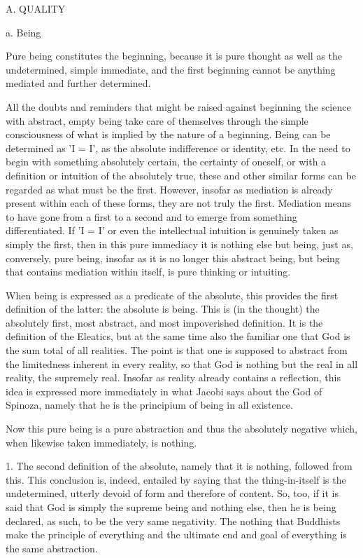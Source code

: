 A. QUALITY

a. Being

Pure being constitutes the beginning,
because it is pure thought as well as
the undetermined, simple immediate, and
the first beginning cannot be anything
mediated and further determined.

All the doubts and reminders that might be raised against
beginning the science with abstract, empty being
take care of themselves through the simple consciousness of
what is implied by the nature of a beginning.
Being can be determined as 'I = I',
as the absolute indifference or identity, etc.
In the need to begin with something absolutely certain,
the certainty of oneself, or with a definition or
intuition of the absolutely true,
these and other similar forms can be
regarded as what must be the first.
However, insofar as mediation is
already present within each of these forms,
they are not truly the first.
Mediation means to have gone from a first to a second
and to emerge from something differentiated.
If 'I = I' or even the intellectual intuition is
genuinely taken as simply the first,
then in this pure immediacy
it is nothing else but being, just as,
conversely, pure being, insofar as it is
no longer this abstract being,
but being that contains mediation within itself,
is pure thinking or intuiting.

When being is expressed as a predicate of the absolute,
this provides the first definition of the latter:
the absolute is being.
This is (in the thought) the absolutely first,
most abstract, and most impoverished definition.
It is the definition of the Eleatics,
but at the same time also the familiar one
that God is the sum total of all realities.
The point is that one is supposed to abstract
from the limitedness inherent in every reality,
so that God is nothing but the real in all reality,
the supremely real.
Insofar as reality already contains a reflection,
this idea is expressed more immediately in what
Jacobi says about the God of Spinoza, namely
that he is the principium of being in all existence.

Now this pure being is a pure abstraction
and thus the absolutely negative
which, when likewise taken immediately, is nothing.

1. The second definition of the absolute,
namely that it is nothing, followed from this.
This conclusion is, indeed, entailed by saying
that the thing-in-itself is the undetermined,
utterly devoid of form and therefore of content.
So, too, if it is said that God is simply
the supreme being and nothing else, then he is being declared,
as such, to be the very same negativity.
The nothing that Buddhists make the principle of everything and
the ultimate end and goal of everything is the same abstraction.

